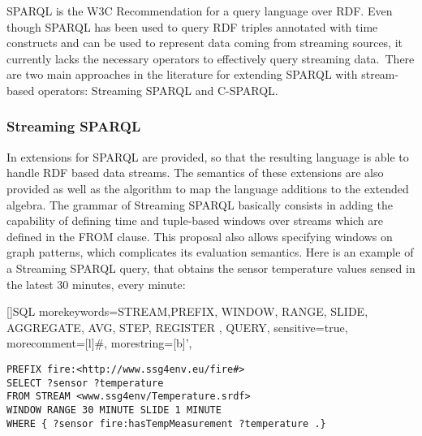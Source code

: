 SPARQL \cite{Prudhommeaux_2008} is the W3C Recommendation for a query language over RDF. Even though  SPARQL has been used to query RDF triples annotated with time constructs \cite{Barbieri_2010,Bolles_08} and can be used to represent data coming from streaming sources, it currently lacks the necessary operators to effectively query streaming data.\
There are two main approaches in the literature for extending SPARQL with stream-based operators: Streaming SPARQL and C-SPARQL.
\subsubsection{Streaming SPARQL}
In \cite{Bolles_08} extensions for SPARQL are provided, so that the resulting language is able to handle RDF based data streams. The semantics of these extensions are also provided as well as the algorithm to map the language additions to the extended algebra. The grammar of Streaming SPARQL basically consists in adding the capability of defining time and tuple-based windows over streams which are defined in the \textsf{FROM} clause. %
This proposal also allows specifying windows on graph patterns, which complicates its evaluation semantics. %
Here is an example of a Streaming SPARQL query, that obtains the sensor temperature values sensed in the latest 30 minutes, every minute:

[]{SQL}{
morekeywords={STREAM,PREFIX, WINDOW, RANGE, SLIDE, AGGREGATE, AVG, STEP, REGISTER , QUERY},
sensitive=true,%
morecomment=[l]\#,%
morestring=[b]',%
}




\begin{lstlisting}[style=SPARQLSTRStyle,language=SPARQLSTR,frame=none]
PREFIX fire:<http://www.ssg4env.eu/fire#>
SELECT ?sensor ?temperature
FROM STREAM <www.ssg4env/Temperature.srdf>
WINDOW RANGE 30 MINUTE SLIDE 1 MINUTE
WHERE { ?sensor fire:hasTempMeasurement ?temperature .}
\end{lstlisting}

